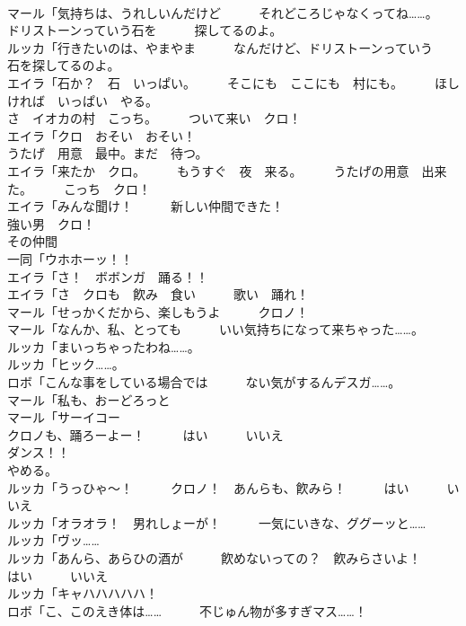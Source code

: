 \documentclass[8pt]{extreport}
\begin{document}
\begin{CJK}{UTF8}{min}
\\	マール「気持ちは、うれしいんだけど　　　それどころじゃなくってね……。　　　ドリストーンっていう石を　　　探してるのよ。	
\\	ルッカ「行きたいのは、やまやま　　　なんだけど、ドリストーンっていう　　　石を探してるのよ。	
\\	エイラ「石か？　石　いっぱい。　　　そこにも　ここにも　村にも。　　　ほしければ　いっぱい　やる。	
\\	さ　イオカの村　こっち。　　　ついて来い　クロ！	
\\	エイラ「クロ　おそい　おそい！	
\\	うたげ　用意　最中。まだ　待つ。	
\\	エイラ「来たか　クロ。　　　もうすぐ　夜　来る。　　　うたげの用意　出来た。　　　こっち　クロ！	
\\	エイラ「みんな聞け！　　　新しい仲間できた！	
\\	強い男　クロ！	
\\	その仲間　
\\	一同「ウホホーッ！！	
\\	エイラ「さ！　ボボンガ　踊る！！	
\\	エイラ「さ　クロも　飮み　食い　　　歌い　踊れ！	
\\	マール「せっかくだから、楽しもうよ　　　クロノ！	
\\	マール「なんか、私、とっても　　　いい気持ちになって来ちゃった……。	
\\	ルッカ「まいっちゃったわね……。	
\\	ルッカ「ヒック……。	
\\	ロボ「こんな事をしている場合では　　　ない気がするんデスガ……。	
\\	マール「私も、おーどろっと
\\	マール「サーイコー
\\	クロノも、踊ろーよー！　　　はい　　　いいえ	
\\	ダンス！！
\\	やめる。	
\\	ルッカ「うっひゃ～！　　　クロノ！　あんらも、飮みら！　　　はい　　　いいえ	
\\	ルッカ「オラオラ！　男れしょーが！　　　一気にいきな、ググーッと……	
\\	ルッカ「ヴッ……	
\\	ルッカ「あんら、あらひの酒が　　　飮めないっての？　飮みらさいよ！　　　はい　　　いいえ	
\\	ルッカ「キャハハハハハ！	
\\	ロボ「こ、このえき体は……　　　不じゅん物が多すぎマス……！	

\end{CJK}
\end{document}
